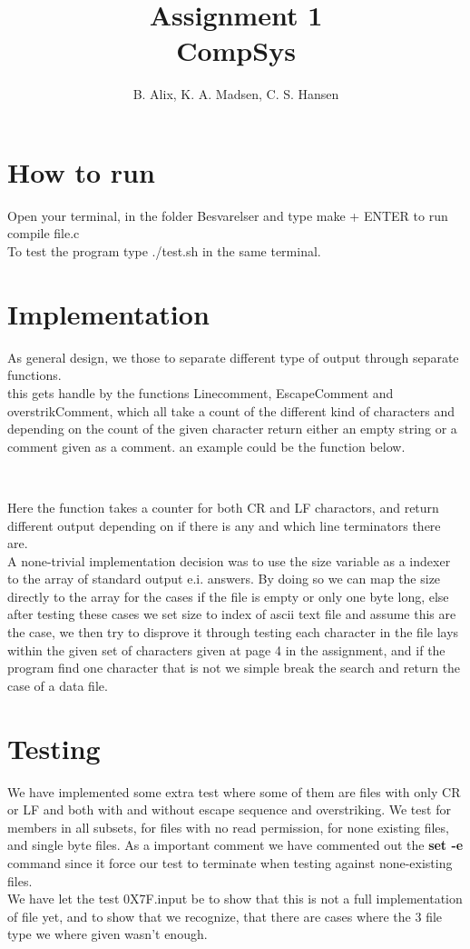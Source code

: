 \documentclass[12pt,a4paper]{article}
\author{B. Alix, K. A. Madsen, C. S. Hansen}
\title{Assignment 1 \\ CompSys}
\begin{document}
\clearpage\maketitle
\thispagestyle{empty}
\setcounter{page}{0}
\newpage

\section*{How to run}
Open your terminal, in the folder Besvarelser and type make + ENTER to run compile file.c
\\[10pt]
To test the program type ./test.sh in the same terminal.
\\[10pt]
\section*{Implementation}
As general design, we those to separate different type of output through separate functions. 
\\
this gets handle by the functions Linecomment, EscapeComment and overstrikComment, 
which all take a count of the different kind of characters and depending on the count of the given character return either an empty string or a comment given as a comment. an example could be the function below.
\\
\inputminted[firstline=22, lastline=33]{c}{file.c}
\\\noindent
Here the function takes a counter for both CR and LF charactors, and return different output depending on if there is any and which line terminators there are.
\\[10pt]
A none-trivial implementation decision was to use the size variable as a indexer to the array of standard output e.i. answers. By doing so we can map the size directly to the array for the cases if the file is empty or only one byte long, else after testing these cases we set size to index of ascii text file and assume this are the case, we then try to disprove it through testing each character in the file lays within the given set of characters given at page 4 in the assignment, and if the program find one character that is not we simple break the search and return the case of a data file.

\section*{Testing}
We have implemented some extra test where some of them are files with only CR or LF and both with and without escape sequence and overstriking. We test for members in all subsets, for files with no read permission, for none existing files, and single byte files. As a important comment we have commented out the \textbf{set -e} command since it force our test to terminate when testing against none-existing files.
\\[10pt]
We have let the test 0X7F.input be to show that this is not a full implementation of file yet, and to show that we recognize, that there are cases where the 3 file type we where given wasn't enough. 
\end{document}
